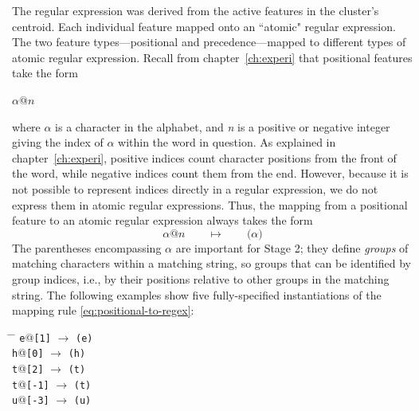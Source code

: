 {The regular expression was derived from the active 
features in the cluster's centroid. Each individual feature mapped onto an ``atomic" regular expression.
The two feature types---positional and precedence---mapped to different types of
atomic regular expression. 
Recall from chapter~\ref{ch:experi} that positional features take 
the form
\begin{centering}
$\alpha\text{@}n$
\end{centering}
where $\alpha$ is a character in the alphabet, and \textit{n} is a positive or negative integer 
giving the index of $\alpha$ within the word in question. As explained in chapter~\ref{ch:experi}, 
positive indices count character positions from the front of the word, while negative indices 
count them from the end. However, because it is not possible to represent indices directly in a regular
expression, we do not express them in atomic regular 
expressions. %
Thus, the mapping from a positional feature to an atomic regular expression always takes the form 
\begin{equation} \label{eq:positional-to-regex}
\alpha\text{@}n \qquad \mapsto \qquad \texttt{(}\alpha\texttt{)}
\end{equation}
The parentheses encompassing $\alpha$ are important for Stage 2; they define 
\emph{groups} of matching characters within a matching
string, so groups that can be identified by group indices, i.e., by their positions relative to other groups
in the matching string.
The following examples show five fully-specified instantiations of the mapping rule \eqref{eq:positional-to-regex}:
\begin{exe}
\ex 
\begin{xlist}
\begin{tabbing}
\hspace{0.7in} \= \hspace{0.5in} \=  \hspace{4.5in} \kill
 \texttt{e}\textrm{@}\texttt{[1]} \> $\to$ \>   \texttt{(e)} \\
 \texttt{h}\textrm{@}\texttt{[0]}  \>$\to$ \>     \texttt{(h)} \\
 \texttt{t}\textrm{@}\texttt{[2]}  \> $\to$   \>       \texttt{(t)} \\
 \texttt{t}@\texttt{[-1]}  \>  $\to$   \>    \texttt{(t)} \\
 \texttt{u}\textrm{@}\texttt{[-3]} \>   $\to$   \>   \texttt{(u)} \\
\end{tabbing}
\end{xlist}
\label{ex:positional-morphs}
\end{exe}

}
